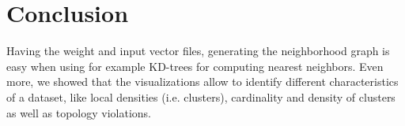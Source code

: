 \documentclass[12pt]{article}
\begin{document}
\section{Conclusion}
Having the weight and input vector files, generating the neighborhood graph is easy when using for example KD-trees for computing nearest neighbors. 
Even more, we showed that the visualizations allow to identify different characteristics of a dataset, like local densities (i.e. clusters), cardinality and density of clusters as well as topology violations.
\end{document}
